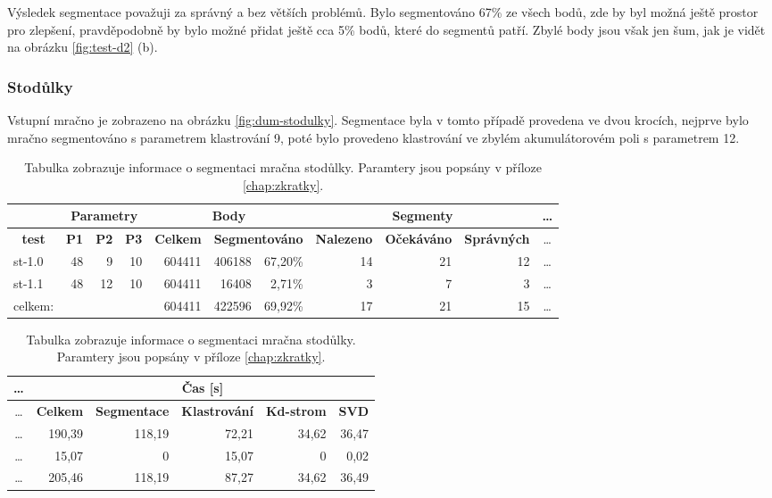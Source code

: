 \documentclass[11pt,twoside,a4paper]{book}
\begin{document}
Výsledek segmentace považuji za správný a bez větších problémů. Bylo segmentováno 67\% ze všech bodů, zde by byl možná ještě prostor pro zlepšení, pravděpodobně by bylo možné přidat ještě cca 5\% bodů, které do segmentů patří. Zbylé body jsou však jen šum, jak je vidět na obrázku \ref{fig:test-d2} (b). 

\cleardoublepage
\subsubsection{Stodůlky}

Vstupní mračno je zobrazeno na obrázku \ref{fig:dum-stodulky}. Segmentace byla v tomto případě provedena ve dvou krocích, nejprve bylo mračno segmentováno s parametrem klastrování 9, poté bylo provedeno klastrování ve zbylém akumulátorovém poli s parametrem 12.

\begin{table}[ht]
\resizebox{\textwidth}{!} {
\begin{tabular}{|l|c|l|l|r|r|r|r|r|r|c|}
\hline
\textbf{} & \multicolumn{ 3}{c|}{\textbf{Parametry}} & \multicolumn{ 3}{c|}{\textbf{Body}} & \multicolumn{ 3}{c|}{\textbf{Segmenty}} &\ldots\\ \hline
\multicolumn{1}{|c|}{\textbf{test}} & \textbf{P1} & \multicolumn{1}{c|}{\textbf{P2}} & \multicolumn{1}{c|}{\textbf{P3}} & \multicolumn{1}{c|}{\textbf{Celkem}} & \multicolumn{ 2}{c|}{\textbf{Segmentováno}} & \multicolumn{1}{c|}{\textbf{Nalezeno}} & \multicolumn{1}{c|}{\textbf{Očekáváno }} & \multicolumn{1}{c|}{\textbf{Správných}} &\ldots\\ \hline
st-1.0 & \multicolumn{1}{r|}{48} & \multicolumn{1}{r|}{9} & \multicolumn{1}{r|}{10} & 604411 & 406188 & 67,20\% & 14 & 21 & 12 &\ldots\\ \hline
st-1.1 & \multicolumn{1}{r|}{48} & \multicolumn{1}{r|}{12} & \multicolumn{1}{r|}{10} & 604411 & 16408 & 2,71\% & 3 & 7 & 3 &\ldots\\ \hline
celkem: & \multicolumn{1}{l|}{} &  &  & 604411 & 422596 & 69,92\% & 17 & 21 & 15&\ldots \\ \hline
\end{tabular}
}
\begin{flushright} \scalebox{0.9} {
\begin{tabular}{|c|r|r|r|r|r|}
\hline
\ldots& \multicolumn{ 5}{|c|}{\textbf{Čas [s]}} \\ \hline
\ldots& \multicolumn{1}{|c|}{\textbf{Celkem}} & \multicolumn{1}{c|}{\textbf{Segmentace}} & \multicolumn{1}{c|}{\textbf{Klastrování}} & \multicolumn{1}{c|}{\textbf{Kd-strom}} & \multicolumn{1}{c|}{\textbf{SVD}} \\ \hline
\ldots& 190,39 & 118,19 & 72,21 & 34,62 & 36,47 \\ \hline
\ldots& 15,07 & 0 & 15,07 & 0 & 0,02 \\ \hline
\ldots& 205,46 & 118,19 & 87,27 & 34,62 & 36,49 \\ \hline
\end{tabular}
}\end{flushright}

\caption{Tabulka zobrazuje informace o segmentaci mračna stodůlky. Paramtery jsou popsány v příloze \ref{chap:zkratky}.} 
\label{table:test-d2}
\end{table}
\end{document}
